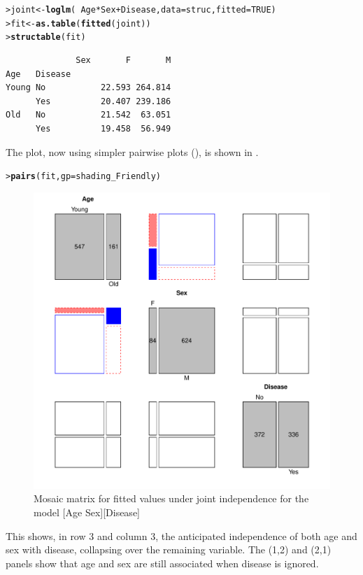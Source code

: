 \documentclass[10pt,krantz2]{krantz}\usepackage[]{graphicx}\usepackage[]{color}
\makeatletter
\newcommand{\hlnum}[1]{\textcolor[rgb]{0.686,0.059,0.569}{#1}}%
\newcommand{\hlopt}[1]{\textcolor[rgb]{0,0,0}{#1}}%
\newcommand{\hlstd}[1]{\textcolor[rgb]{0.345,0.345,0.345}{#1}}%
\newcommand{\hlkwb}[1]{\textcolor[rgb]{0.69,0.353,0.396}{#1}}%
\newcommand{\hlkwc}[1]{\textcolor[rgb]{0.333,0.667,0.333}{#1}}%
\newcommand{\hlkwd}[1]{\textcolor[rgb]{0.737,0.353,0.396}{\textbf{#1}}}%
\newenvironment{kframe}{%
 \def\at@end@of@kframe{}%
 \ifinner\ifhmode%
  \def\at@end@of@kframe{\end{minipage}}%
  \begin{minipage}{\columnwidth}%
 \fi\fi%
 \def\FrameCommand##1{\hskip\@totalleftmargin \hskip-\fboxsep
 \colorbox{shadecolor}{##1}\hskip-\fboxsep
     \hskip-\linewidth \hskip-\@totalleftmargin \hskip\columnwidth}%
 \MakeFramed {\advance\hsize-\width
   \@totalleftmargin\z@ \linewidth\hsize
   \@setminipage}}%
 {\par\unskip\endMakeFramed%
 \at@end@of@kframe}
\newenvironment{knitrout}{}{} %
\renewenvironment{knitrout}{\small\renewcommand{\baselinestretch}{.85}}{} %
\makeatother
\begin{document}
\begin{knitrout}
\color{fgcolor}\begin{kframe}
\begin{alltt}
\hlstd{> }\hlstd{joint} \hlkwb{<-} \hlkwd{loglm}\hlstd{(}\hlopt{~} \hlstd{Age} \hlopt{*} \hlstd{Sex} \hlopt{+} \hlstd{Disease,} \hlkwc{data} \hlstd{= struc,} \hlkwc{fitted} \hlstd{=} \hlnum{TRUE}\hlstd{)}
\hlstd{> }\hlstd{fit} \hlkwb{<-} \hlkwd{as.table}\hlstd{(}\hlkwd{fitted}\hlstd{(joint))}
\hlstd{> }\hlkwd{structable}\hlstd{(fit)}
\end{alltt}
\begin{verbatim}
              Sex       F       M
Age   Disease                    
Young No           22.593 264.814
      Yes          20.407 239.186
Old   No           21.542  63.051
      Yes          19.458  56.949
\end{verbatim}
\end{kframe}
\end{knitrout}

The  plot, now using simpler pairwise plots (),
is shown in .
\begin{knitrout}
\color{fgcolor}\begin{kframe}
\begin{alltt}
\hlstd{> }\hlkwd{pairs}\hlstd{(fit,} \hlkwc{gp} \hlstd{= shading_Friendly)}
\end{alltt}
\end{kframe}\begin{figure}[!htb]

\centerline{\includegraphics[width=.7\textwidth]{ch05/fig/struc-mos4-1} }

\caption[Mosaic matrix for fitted values under joint independence]{Mosaic matrix for fitted values under joint independence for the model [Age Sex][Disease]\label{fig:struc-mos4}}
\end{figure}


\end{knitrout}
This shows, in row 3 and column 3, the anticipated independence of both age and sex with
disease, collapsing over the remaining variable.
The (1,2) and (2,1) panels show that age and sex are still associated
when disease is ignored.
\end{document}

